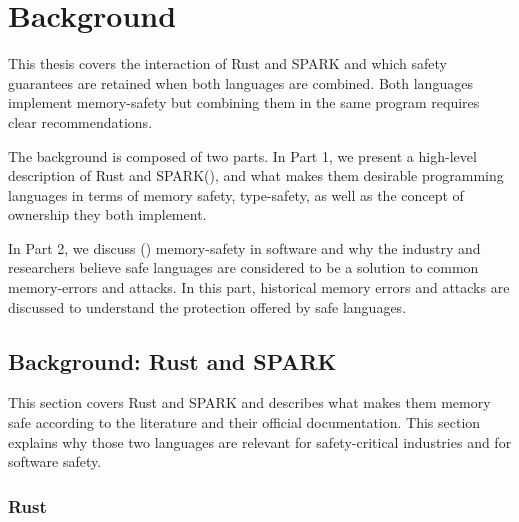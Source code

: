 \documentclass[nomenclature, english, bibtex]{kththesis}
\begin{document}
\renewcommand{\glossarysection}[2][]{}
\printglossary[type=introductiongloss, style=mydefs, 
]


\cleardoublepage\chapter{Background}
\label{ch:background}

This thesis covers the interaction of Rust and SPARK and which safety guarantees are retained when both languages are combined. Both languages implement \gls{memory-safety} but combining them in the same program requires clear recommendations. 

The background is composed of two parts. 
In Part 1, we present a 
high-level description of Rust and SPARK(), and what makes them desirable programming languages in terms of memory safety, \gls{type-safety}, as well as the concept of \gls{ownership} they both implement.

In Part 2, we discuss () \gls{memory-safety} in software and why the industry and researchers believe safe languages are considered to be a solution to common \gls{memory-error}s and attacks. In this part, historical memory errors and attacks are discussed to understand the protection offered by safe languages. 

\section{Background: Rust and SPARK}
\label{sec:rust_and_spark}

This section covers Rust and SPARK and describes what makes them memory safe according to the literature and their official documentation. This section explains why those two languages are relevant for \gls{safety-critical} industries and for software safety.


\subsection{Rust}
\end{document}
